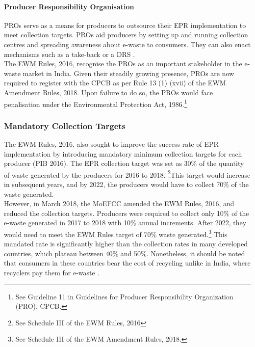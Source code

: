 \documentclass[a4paper, 12pt]{article}
\begin{document}
                    \paragraph{Producer Responsibility Organisation}
                    
                    PROs serve as a means for producers to outsource their EPR implementation to meet collection targets. PROs aid producers by setting up and running collection centres and spreading awareness about e-waste to consumers. They can also enact mechanisms such as a take-back or a DRS \parencite{cpcbproreport}. \\
                    
                    The EWM Rules, 2016, recognise the PROs as an important stakeholder in the e-waste market in India. Given their steadily growing presence, PROs are now required to register with the CPCB as per Rule 13 (1) (xvii) of the EWM Amendment Rules, 2018. Upon failure to do so, the PROs would face penalisation under the Environmental Protection Act, 1986.\footnote{See Guideline 11 in Guidelines for Producer Responsibility Organization (PRO), CPCB.} 
                    
                    \subsubsection{Mandatory Collection Targets}
                    
                    The EWM Rules, 2016, also sought to improve the success rate of EPR implementation by introducing mandatory minimum collection targets for each producer (PIB 2016). The EPR collection target was set as 30\% of the quantity of waste generated by the producers for 2016 to 2018. \footnote{See Schedule III of the EWM Rules, 2016}This target would increase in subsequent years, and by 2022, the producers would have to collect 70\% of the waste generated. \\
                    
                    However, in March 2018, the MoEFCC amended the EWM Rules, 2016, and reduced the collection targets. Producers were required to collect only 10\% of the e-waste generated in 2017 to 2018 with 10\% annual increments. After 2022, they would need to meet the EWM Rules target of 70\% waste generated.\footnote{See Schedule III of the EWM Amendment Rules, 2018.} This mandated rate is significantly higher than the collection rates in many developed countries, which plateau between 40\% and 50\%. Nonetheless, it should be noted that consumers in these countries bear the cost of recycling unlike in India, where recyclers pay them for e-waste \parencite{veitreport}. \\
                    
\end{document}
